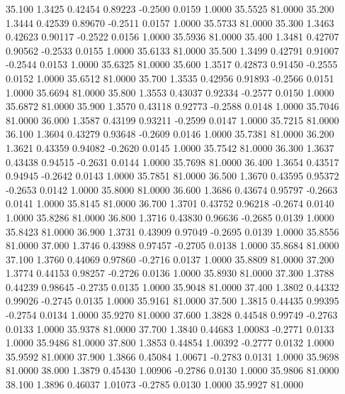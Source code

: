   35.100   1.3425   0.42454   0.89223  -0.2500   0.0159   1.0000  35.5525  81.0000
  35.200   1.3444   0.42539   0.89670  -0.2511   0.0157   1.0000  35.5733  81.0000
  35.300   1.3463   0.42623   0.90117  -0.2522   0.0156   1.0000  35.5936  81.0000
  35.400   1.3481   0.42707   0.90562  -0.2533   0.0155   1.0000  35.6133  81.0000
  35.500   1.3499   0.42791   0.91007  -0.2544   0.0153   1.0000  35.6325  81.0000
  35.600   1.3517   0.42873   0.91450  -0.2555   0.0152   1.0000  35.6512  81.0000
  35.700   1.3535   0.42956   0.91893  -0.2566   0.0151   1.0000  35.6694  81.0000
  35.800   1.3553   0.43037   0.92334  -0.2577   0.0150   1.0000  35.6872  81.0000
  35.900   1.3570   0.43118   0.92773  -0.2588   0.0148   1.0000  35.7046  81.0000
  36.000   1.3587   0.43199   0.93211  -0.2599   0.0147   1.0000  35.7215  81.0000
  36.100   1.3604   0.43279   0.93648  -0.2609   0.0146   1.0000  35.7381  81.0000
  36.200   1.3621   0.43359   0.94082  -0.2620   0.0145   1.0000  35.7542  81.0000
  36.300   1.3637   0.43438   0.94515  -0.2631   0.0144   1.0000  35.7698  81.0000
  36.400   1.3654   0.43517   0.94945  -0.2642   0.0143   1.0000  35.7851  81.0000
  36.500   1.3670   0.43595   0.95372  -0.2653   0.0142   1.0000  35.8000  81.0000
  36.600   1.3686   0.43674   0.95797  -0.2663   0.0141   1.0000  35.8145  81.0000
  36.700   1.3701   0.43752   0.96218  -0.2674   0.0140   1.0000  35.8286  81.0000
  36.800   1.3716   0.43830   0.96636  -0.2685   0.0139   1.0000  35.8423  81.0000
  36.900   1.3731   0.43909   0.97049  -0.2695   0.0139   1.0000  35.8556  81.0000
  37.000   1.3746   0.43988   0.97457  -0.2705   0.0138   1.0000  35.8684  81.0000
  37.100   1.3760   0.44069   0.97860  -0.2716   0.0137   1.0000  35.8809  81.0000
  37.200   1.3774   0.44153   0.98257  -0.2726   0.0136   1.0000  35.8930  81.0000
  37.300   1.3788   0.44239   0.98645  -0.2735   0.0135   1.0000  35.9048  81.0000
  37.400   1.3802   0.44332   0.99026  -0.2745   0.0135   1.0000  35.9161  81.0000
  37.500   1.3815   0.44435   0.99395  -0.2754   0.0134   1.0000  35.9270  81.0000
  37.600   1.3828   0.44548   0.99749  -0.2763   0.0133   1.0000  35.9378  81.0000
  37.700   1.3840   0.44683   1.00083  -0.2771   0.0133   1.0000  35.9486  81.0000
  37.800   1.3853   0.44854   1.00392  -0.2777   0.0132   1.0000  35.9592  81.0000
  37.900   1.3866   0.45084   1.00671  -0.2783   0.0131   1.0000  35.9698  81.0000
  38.000   1.3879   0.45430   1.00906  -0.2786   0.0130   1.0000  35.9806  81.0000
  38.100   1.3896   0.46037   1.01073  -0.2785   0.0130   1.0000  35.9927  81.0000
